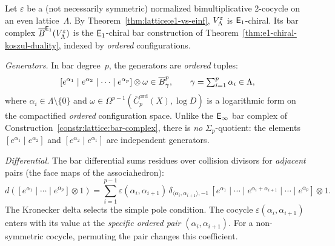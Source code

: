 \begin{construction}
\label{constr:lattice:e1-bar}
Let $\varepsilon$ be a (not necessarily symmetric) normalized
bimultiplicative 2-cocycle on an even lattice~$\Lambda$.
By Theorem~\ref{thm:lattice:e1-vs-einf}, $V_\Lambda^\varepsilon$
is $\mathsf{E}_1$-chiral.  Its bar complex
$\overline{B}^{\mathsf{E}_1}(V_\Lambda^\varepsilon)$ is the $\mathsf{E}_1$-chiral bar
construction of Theorem~\ref{thm:e1-chiral-koszul-duality}, indexed by
\emph{ordered} configurations.

\noindent\emph{Generators.} In bar degree~$p$, the generators are
\emph{ordered} tuples:
\[
[e^{\alpha_1} \mid e^{\alpha_2} \mid \cdots \mid e^{\alpha_p}]
\otimes \omega \in \overline{B}^p_\gamma,
\qquad
\gamma = \textstyle\sum_{i=1}^p \alpha_i \in \Lambda,
\]
where $\alpha_i \in \Lambda \setminus \{0\}$ and
$\omega \in \Omega^{p-1}(\overline{C}^{\mathrm{ord}}_p(X), \log D)$
is a logarithmic form on the compactified \emph{ordered} configuration
space.  Unlike the $\mathsf{E}_{\infty}$ bar complex of
Construction~\ref{constr:lattice:bar-complex}, there is \emph{no}
$\Sigma_p$-quotient: the elements $[e^{\alpha_1} \mid e^{\alpha_2}]$
and $[e^{\alpha_2} \mid e^{\alpha_1}]$ are independent generators.

\noindent\emph{Differential.} The bar differential sums residues over
collision divisors for \emph{adjacent} pairs (the face maps of the
associahedron):
\begin{equation}\label{eq:lattice:e1-bar-diff}
d([e^{\alpha_1} \mid \cdots \mid e^{\alpha_p}] \otimes 1)
= \sum_{i=1}^{p-1}
  \varepsilon(\alpha_i, \alpha_{i+1})\,
  \delta_{\langle\alpha_i,\alpha_{i+1}\rangle, -1}\,
  [e^{\alpha_1} \mid \cdots \mid
   e^{\alpha_i + \alpha_{i+1}} \mid \cdots \mid e^{\alpha_p}]
  \otimes 1.
\end{equation}
The Kronecker delta selects the simple pole condition.  The cocycle
$\varepsilon(\alpha_i, \alpha_{i+1})$ enters with its value at the
\emph{specific ordered pair} $(\alpha_i, \alpha_{i+1})$.  For a
non-symmetric cocycle, permuting the pair changes this coefficient.
\end{construction}

